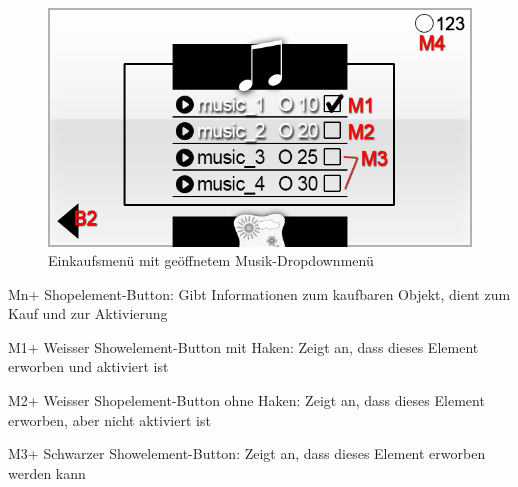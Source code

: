 \begin{figure}[H]
\centering
\includegraphics[scale=0.55]{../gui/_jpeg_numeration/shop_popup.jpg}
\caption{Einkaufsmenü mit geöffnetem Musik-Dropdownmenü}
\label{fig:Einkaufsmenu_Dropdown}
\end{figure}
\begin{description*}
\item[Mn+] Shopelement-Button: Gibt Informationen zum kaufbaren Objekt, dient zum Kauf und zur Aktivierung
\item[M1+] Weisser Showelement-Button mit Haken: Zeigt an, dass dieses Element erworben und aktiviert ist
\item[M2+] Weisser Shopelement-Button ohne Haken: Zeigt an, dass dieses Element erworben, aber nicht aktiviert ist
\item[M3+] Schwarzer Showelement-Button: Zeigt an, dass dieses Element erworben werden kann
\end{description*}
